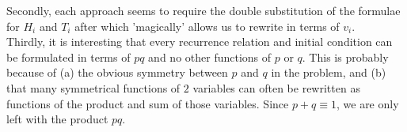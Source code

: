 Secondly, each approach seems to require the double substitution of the formulae for $H_i$ and $T_i$ after which 'magically' allows us to rewrite in terms of $v_i$. \\
Thirdly, it is interesting that every recurrence relation and initial condition can be formulated in terms of $pq$ and no other functions of $p$ or $q$. 
This is probably because of (a) the obvious symmetry between $p$ and $q$ in the problem, 
and (b) that many symmetrical functions of $2$ variables can often be rewritten as functions of the product and sum of those variables. 
Since $p+q \equiv 1$, we are only left with the product $pq$.  




